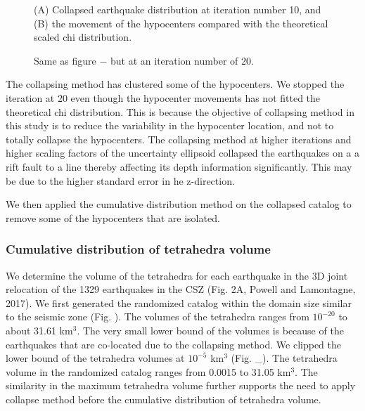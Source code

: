 \documentclass[draft]{agujournal2018}
\begin{document}
\begin{figure}[ht]
\centering
\caption{(A) Collapsed earthquake distribution at iteration number 10, and (B) the movement of the hypocenters compared with the theoretical scaled chi distribution.}
\label{figfour}
\end{figure} 


\begin{figure}[ht]
\centering
\caption{Same as figure $-$ but at an iteration number of 20.}
\label{figfour}
\end{figure} 


The collapsing method has clustered some of the hypocenters. We stopped the iteration at 20 even though the hypocenter movements has not fitted the theoretical chi distribution. This is because the objective of collapsing method in this study is to reduce the variability in the hypocenter location, and not to totally collapse the hypocenters. The collapsing method at higher iterations and higher scaling factors of the uncertainty ellipsoid collapsed the earthquakes on a a rift fault to a line thereby affecting its depth information significantly. This may be due to the higher standard error in he z-direction.%

We then applied the cumulative distribution method on the collapsed catalog to remove some of the hypocenters that are isolated. %


\subsubsection{Cumulative distribution of tetrahedra volume}
We determine the volume of the tetrahedra for each earthquake in the 3D joint relocation of the 1329 earthquakes in the CSZ (Fig. 2A, Powell and Lamontagne, 2017). We first generated the randomized catalog within the domain size similar to the seismic zone (Fig. ). The volumes of the tetrahedra ranges from $10^{-20}$ to about 31.61 km$^{3}$. The very small lower bound of the volumes is because of the earthquakes that are co-located due to the collapsing method. We clipped the lower bound of the tetrahedra volumes at $10^{-5}$ km$^{3}$ (Fig. \_). The tetrahedra volume in the randomized catalog ranges from 0.0015 to 31.05 km$^{3}$. The similarity in the maximum tetrahedra volume further supports the need to apply collapse method before the cumulative distribution of tetrahedra volume.
\end{document}
